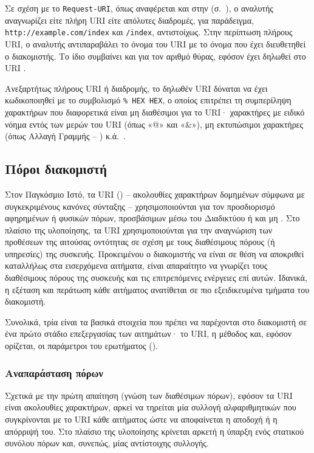 Σε σχέση με το \verb~Request-URI~, όπως αναφέρεται και στην
(σ.~\pageref{ssubsec:network:resource-general}), ο αναλυτής αναγνωρίζει είτε
πλήρη URI είτε απόλυτες διαδρομές, για παράδειγμα,
\verb~http://example.com/index~ και \verb~/index~, αντιστοίχως. Στην περίπτωση
πλήρους URI, ο αναλυτής αντιπαραβάλει το όνομα του URI με το όνομα που έχει
διευθετηθεί ο διακομιστής. Το ίδιο συμβαίνει και για τον αριθμό θύρας, εφόσον
έχει δηλωθεί στο URI \parencite[49]{rfc3986}.

Ανεξαρτήτως πλήρους URI ή διαδρομής, το δηλωθέν URI δύναται να έχει
κωδικοποιηθεί με το συμβολισμό \verb~% HEX HEX~, ο οποίος επιτρέπει τη
συμπερίληψη χαρακτήρων που διαφορετικά είναι μη διαθέσιμοι για το URI·
χαρακτήρες με ειδικό νόημα εντός των μερών του URI (όπως «@» και «\&»), μη
εκτυπώσιμοι χαρακτήρες (όπως Αλλαγή Γραμμής -- ) κ.ά.\
\parencite[9--11]{rfc2396}.


\subsection{Πόροι διακομιστή}
\label{subsec:network:resource}

Στον Παγκόσμιο Ιστό, τα URI () -- ακολουθίες
χαρακτήρων δομημένων σύμφωνα με συγκεκριμένους κανόνες σύνταξης --
χρησιμοποιούνται για τον προσδιορισμό αφηρημένων ή φυσικών πόρων, προσβάσιμων
μέσω του Διαδικτύου ή και μη \parencite[1,5]{rfc3986}.
Στο πλαίσιο της υλοποίησης, τα URI χρησιμοποιούνται για την αναγνώριση των
προθέσεων της αιτούσας οντότητας σε σχέση με τους διαθέσιμους πόρους (ή
υπηρεσίες) της συσκευής. Προκειμένου ο διακομιστής να είναι σε θέση να αποκριθεί
καταλλήλως στα εισερχόμενα αιτήματα, είναι απαραίτητο να γνωρίζει τους
διαθέσιμους πόρους της συσκευής και τις επιτρεπόμενες ενέργειες επί αυτών.
Ιδανικά, η εξέταση και περάτωση κάθε αιτήματος ανατίθεται σε πιο εξειδικευμένα
τμήματα του διακομιστή.

Συνολικά, τρία είναι τα βασικά στοιχεία που πρέπει να παρέχονται στο διακομιστή
σε ένα πρώτο στάδιο επεξεργασίας των αιτημάτων· το URI, η μέθοδος και, εφόσον
ορίζεται, οι παράμετροι του ερωτήματος (\te{query string}).

\subsubsection{Αναπαράσταση πόρων}

Σχετικά με την πρώτη απαίτηση (γνώση των διαθέσιμων πόρων),
εφόσον τα URI είναι ακολουθίες χαρακτήρων, αρκεί να τηρείται μία συλλογή
αλφαριθμητικών που συγκρίνονται με το URI κάθε αιτήματος ώστε να αποφαίνεται η
αποδοχή ή η απόρριψή του. Στο πλαίσιο της υλοποίησης κρίνεται αρκετή η ύπαρξη
ενός στατικού συνόλου πόρων και, συνεπώς, μίας αντίστοιχης συλλογής.

